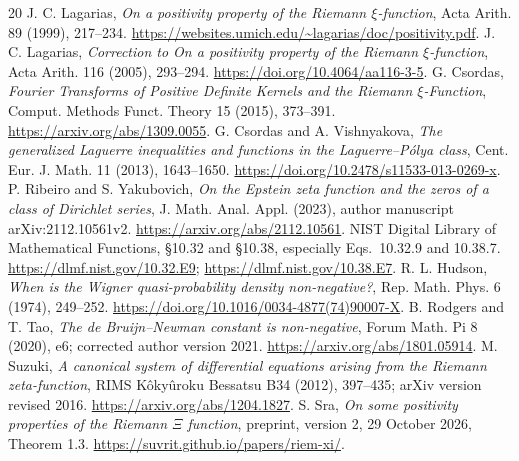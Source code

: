 \documentclass[11pt,letterpaper]{article}
\numberwithin{equation}{section}
\theoremstyle{remark}\newtheorem{remark}[proposition]{Remark}
\begin{document}
\begin{thebibliography}{20}
\small
\setlength{\itemsep}{2pt}
J. C. Lagarias, \emph{On a positivity property of the Riemann $\xi$-function},
Acta Arith. 89 (1999), 217--234.
\url{https://websites.umich.edu/~lagarias/doc/positivity.pdf}.
J. C. Lagarias, \emph{Correction to On a positivity property of the Riemann $\xi$-function},
Acta Arith. 116 (2005), 293--294.
\url{https://doi.org/10.4064/aa116-3-5}.
G. Csordas, \emph{Fourier Transforms of Positive Definite Kernels and the Riemann $\xi$-Function},
Comput. Methods Funct. Theory 15 (2015), 373--391.
\url{https://arxiv.org/abs/1309.0055}.
G. Csordas and A. Vishnyakova, \emph{The generalized Laguerre inequalities and functions in the Laguerre--P\'olya class},
Cent. Eur. J. Math. 11 (2013), 1643--1650.
\url{https://doi.org/10.2478/s11533-013-0269-x}.
P. Ribeiro and S. Yakubovich, \emph{On the Epstein zeta function and the zeros of a class of Dirichlet series},
J. Math. Anal. Appl. (2023), author manuscript arXiv:2112.10561v2.
\url{https://arxiv.org/abs/2112.10561}.
NIST Digital Library of Mathematical Functions, \S10.32 and \S10.38, especially
Eqs.~10.32.9 and 10.38.7.
\url{https://dlmf.nist.gov/10.32.E9};
\url{https://dlmf.nist.gov/10.38.E7}.
R. L. Hudson, \emph{When is the Wigner quasi-probability density non-negative?},
Rep. Math. Phys. 6 (1974), 249--252.
\url{https://doi.org/10.1016/0034-4877(74)90007-X}.
B. Rodgers and T. Tao, \emph{The de Bruijn--Newman constant is non-negative},
Forum Math. Pi 8 (2020), e6; corrected author version 2021.
\url{https://arxiv.org/abs/1801.05914}.
M. Suzuki, \emph{A canonical system of differential equations arising from the Riemann zeta-function},
RIMS K\^oky\^uroku Bessatsu B34 (2012), 397--435; arXiv version revised 2016.
\url{https://arxiv.org/abs/1204.1827}.
S. Sra, \emph{On some positivity properties of the Riemann $\Xi$ function},
preprint, version 2, 29 October 2026, Theorem 1.3.
\url{https://suvrit.github.io/papers/riem-xi/}.
\end{thebibliography}
\end{document}
